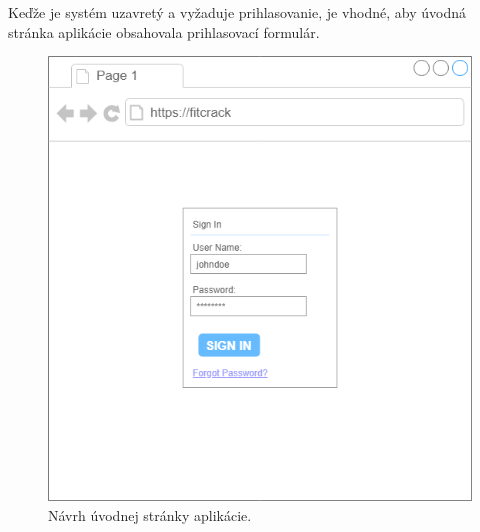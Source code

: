 \documentclass[slovak,cprint]{fitthesis} %
\begin{document}
Keďže je systém uzavretý a vyžaduje prihlasovanie, je vhodné, aby úvodná stránka aplikácie obsahovala prihlasovací formulár. 
\begin{figure}[h]
    \label{fig:moduly}
    \centering
    \includegraphics[scale=0.4]{obrazky/loginscreen.png}
    \caption{Návrh úvodnej stránky aplikácie.}
\end{figure}
\end{document}
